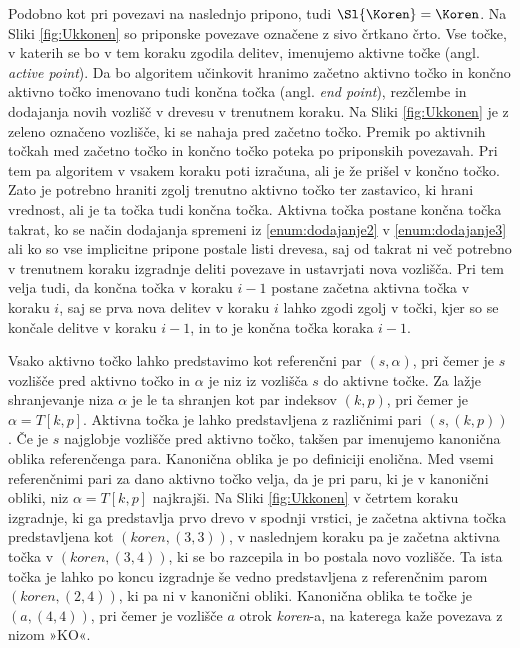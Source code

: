 Podobno kot pri povezavi na naslednjo pripono, tudi $\Sl{\Koren}=\Koren$. Na Sliki \ref{fig:Ukkonen} so priponske povezave označene z sivo črtkano črto. Vse točke, v katerih se bo v tem koraku zgodila delitev, imenujemo aktivne točke (angl. \textit{active point}). Da bo algoritem učinkovit hranimo začetno aktivno točko in končno aktivno točko imenovano tudi končna točka (angl. \textit{end point}), rezčlembe in dodajanja novih vozlišč v drevesu v trenutnem koraku. Na Sliki \ref{fig:Ukkonen} je z zeleno označeno vozlišče, ki se nahaja pred začetno točko. Premik po aktivnih točkah med začetno točko in končno točko poteka po priponskih povezavah. Pri tem pa algoritem v vsakem koraku poti izračuna, ali je že prišel v končno točko. Zato je potrebno hraniti zgolj trenutno aktivno točko ter zastavico, ki hrani vrednost, ali je ta točka tudi končna točka. Aktivna točka postane končna točka takrat, ko se način dodajanja spremeni iz \ref{enum:dodajanje2} v \ref{enum:dodajanje3} ali ko so vse implicitne pripone postale listi drevesa, saj od takrat ni več potrebno v trenutnem koraku izgradnje deliti povezave in ustavrjati nova vozlišča. Pri tem velja tudi, da končna točka v koraku $i-1$ postane začetna aktivna točka v koraku $i$, saj se prva nova delitev v koraku $i$ lahko zgodi zgolj v točki, kjer so se končale delitve v koraku $i-1$, in to je končna točka koraka $i-1$. 

Vsako aktivno točko lahko predstavimo kot referenčni par $(s,\alpha)$, pri čemer je $s$ vozlišče pred aktivno točko in $\alpha$ je niz iz vozlišča $s$ do aktivne točke. Za lažje shranjevanje niza $\alpha$ je le ta shranjen kot par indeksov $(k,p)$, pri čemer je $\alpha=T[k,p]$. Aktivna točka je lahko predstavljena z različnimi pari $(s, (k,p))$. Če je $s$  najglobje vozlišče pred aktivno točko, takšen par imenujemo kanonična oblika referenčenga para. Kanonična oblika je po definiciji enolična. Med vsemi referenčnimi pari za dano aktivno točko velja, da je pri paru, ki je v kanonični obliki, niz $\alpha=T[k,p]$ najkrajši. Na Sliki \ref{fig:Ukkonen} v četrtem koraku izgradnje, ki ga predstavlja prvo drevo v spodnji vrstici, je začetna aktivna točka predstavljena kot $(\textit{koren},(3,3))$, v naslednjem koraku pa je začetna aktivna točka v $(\textit{koren},(3,4))$, ki se bo razcepila in bo postala novo vozlišče. Ta ista točka je lahko po koncu izgradnje še vedno predstavljena z referenčnim parom $(\textit{koren},(2,4))$, ki pa ni v kanonični obliki. Kanonična oblika te točke je $(a,(4,4))$, pri čemer je vozlišče $a$ otrok \textit{koren}-a, na katerega kaže povezava z nizom »KO«.

